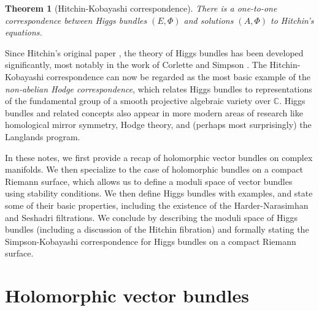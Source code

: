 \documentclass[10pt]{amsart}
\numberwithin{equation}{section}
\newcommand{\C}{\mathbb{C}}
\theoremstyle{plain}
\newtheorem*{thm*}{Theorem}
\theoremstyle{definition}
\theoremstyle{remark}
\begin{document}
\begin{thm*}[Hitchin-Kobayashi correspondence]
    There is a one-to-one correspondence between Higgs bundles $(E, \Phi)$ and solutions $(A, \Phi)$ to Hitchin's equations.
\end{thm*} 

Since Hitchin's original paper \cite{hitchin1987A}, the theory of Higgs bundles has 
been developed significantly, most notably in the work of Corlette \cite{corlette1988} and Simpson \cite{simpson92}. The Hitchin-Kobayashi correspondence can now be regarded as the most basic example of the \emph{non-abelian Hodge correspondence}, which relates Higgs bundles to representations of the fundamental group of a smooth projective algebraic variety over $\C$. Higgs bundles and related concepts also appear in more modern areas of research like homological mirror symmetry, Hodge theory, and (perhaps most surprisingly) the Langlands program. 

In these notes, we first provide a recap of holomorphic vector bundles on complex manifolds. We then specialize to the case of holomorphic bundles on a compact Riemann surface, which allows us to define a moduli space of vector bundles using stability conditions. We then define Higgs bundles with examples, and state some of their basic properties, including the existence of the Harder-Narasimhan and Seshadri filtrations. We conclude by describing the moduli space of Higgs bundles (including a discussion of the Hitchin fibration) and formally stating the Simpson-Kobayashi correspondence for Higgs bundles on a compact Riemann surface.

\section{Holomorphic vector bundles} 
\end{document}
